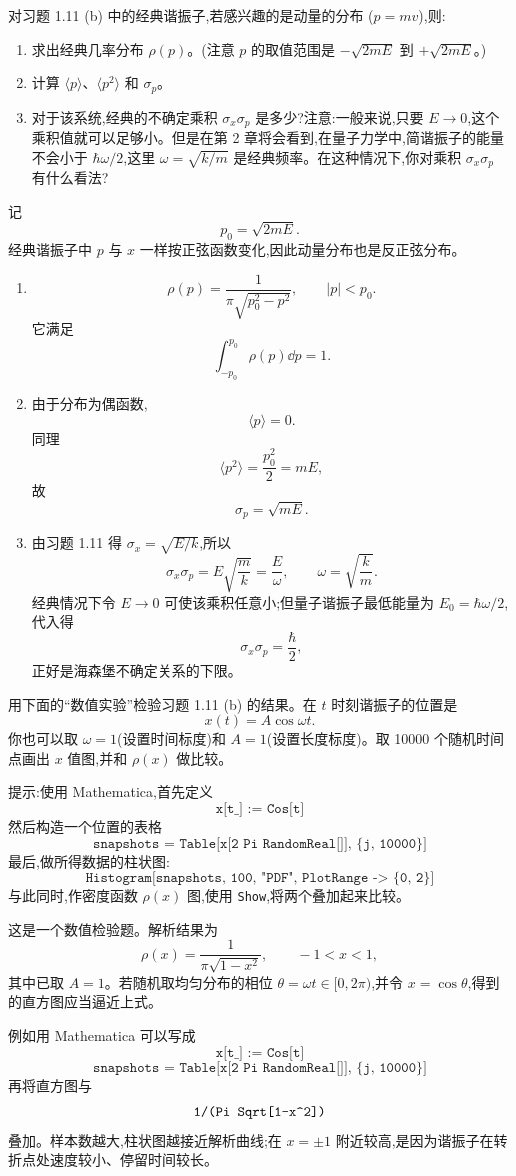 \begin{question}
对习题 1.11 (b) 中的经典谐振子,若感兴趣的是动量的分布 ($p=mv$),则:
\begin{enumerate}
\item 求出经典几率分布 $\rho(p)$。(注意 $p$ 的取值范围是 $-\sqrt{2mE}$ 到 $+\sqrt{2mE}$。)
\item 计算 $\langle p\rangle$、$\langle p^2\rangle$ 和 $\sigma_p$。
\item 对于该系统,经典的不确定乘积 $\sigma_x\sigma_p$ 是多少?注意:一般来说,只要 $E\to0$,这个乘积值就可以足够小。但是在第 2 章将会看到,在量子力学中,简谐振子的能量不会小于 $\hbar\omega/2$,这里 $\omega=\sqrt{k/m}$ 是经典频率。在这种情况下,你对乘积 $\sigma_x\sigma_p$ 有什么看法?
\end{enumerate}
\end{question}
\begin{solution}
记
\[
p_0=\sqrt{2mE}.
\]
经典谐振子中 $p$ 与 $x$ 一样按正弦函数变化,因此动量分布也是反正弦分布。
\begin{enumerate}
\item
\[
\rho(p)=\frac{1}{\pi\sqrt{p_0^2-p^2}},\qquad |p|<p_0.
\]
它满足
\[
\int_{-p_0}^{p_0}\rho(p)\dd p=1.
\]
\item 由于分布为偶函数,
\[
\langle p\rangle=0.
\]
同理
\[
\langle p^2\rangle=\frac{p_0^2}{2}=mE,
\]
故
\[
\sigma_p=\sqrt{mE}.
\]
\item 由习题 1.11 得 $\sigma_x=\sqrt{E/k}$,所以
\[
\sigma_x\sigma_p=E\sqrt{\frac{m}{k}}=\frac{E}{\omega},
\qquad \omega=\sqrt{\frac{k}{m}}.
\]
经典情况下令 $E\to0$ 可使该乘积任意小;但量子谐振子最低能量为 $E_0=\hbar\omega/2$,代入得
\[
\sigma_x\sigma_p=\frac{\hbar}{2},
\]
正好是海森堡不确定关系的下限。
\end{enumerate}
\end{solution}

\begin{question}
用下面的“数值实验”检验习题 1.11 (b) 的结果。在 $t$ 时刻谐振子的位置是
\[
x(t)=A\cos\omega t.
\tag{1.44}
\]
你也可以取 $\omega=1$(设置时间标度)和 $A=1$(设置长度标度)。取 10000 个随机时间点画出 $x$ 值图,并和 $\rho(x)$ 做比较。

提示:使用 Mathematica,首先定义
\[
\texttt{x[t\_] := Cos[t]}
\]
然后构造一个位置的表格
\[
\texttt{snapshots = Table[x[2 Pi RandomReal[]], \{j, 10000\}]}
\]
最后,做所得数据的柱状图:
\[
\texttt{Histogram[snapshots, 100, "PDF", PlotRange -> \{0, 2\}]}
\]
与此同时,作密度函数 $\rho(x)$ 图,使用 \texttt{Show},将两个叠加起来比较。
\end{question}
\begin{solution}
这是一个数值检验题。解析结果为
\[
\rho(x)=\frac{1}{\pi\sqrt{1-x^2}},\qquad -1<x<1,
\]
其中已取 $A=1$。若随机取均匀分布的相位 $\theta=\omega t\in[0,2\pi)$,并令 $x=\cos\theta$,得到的直方图应当逼近上式。

例如用 Mathematica 可以写成
\[
\texttt{x[t\_] := Cos[t]}
\]
\[
\texttt{snapshots = Table[x[2 Pi RandomReal[]], \{j, 10000\}]}
\]
再将直方图与
\[
\texttt{1/(Pi Sqrt[1-x\string^2])}
\]
叠加。样本数越大,柱状图越接近解析曲线;在 $x=\pm1$ 附近较高,是因为谐振子在转折点处速度较小、停留时间较长。
\end{solution}

